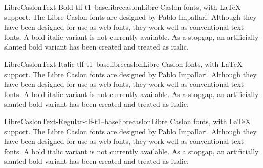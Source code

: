 \documentclass{ddltxtyp}
\begin{document}
\begin{package}{LibreCaslonText-Bold-tlf-t1--base}{librecaslon}{Libre Caslon fonts, with {\LaTeX} support.}
The Libre Caslon fonts are designed by Pablo Impallari.
Although they have been designed for use as web fonts, they
work well as conventional text fonts. A bold italic variant is
not currently available. As a stopgap, an artificially slanted
bold variant has been created and treated as italic.
\end{package}
\begin{package}{LibreCaslonText-Italic-tlf-t1--base}{librecaslon}{Libre Caslon fonts, with {\LaTeX} support.}
The Libre Caslon fonts are designed by Pablo Impallari.
Although they have been designed for use as web fonts, they
work well as conventional text fonts. A bold italic variant is
not currently available. As a stopgap, an artificially slanted
bold variant has been created and treated as italic.
\end{package}
\begin{package}{LibreCaslonText-Regular-tlf-t1--base}{librecaslon}{Libre Caslon fonts, with {\LaTeX} support.}
The Libre Caslon fonts are designed by Pablo Impallari.
Although they have been designed for use as web fonts, they
work well as conventional text fonts. A bold italic variant is
not currently available. As a stopgap, an artificially slanted
bold variant has been created and treated as italic.
\end{package}

\end{document}
